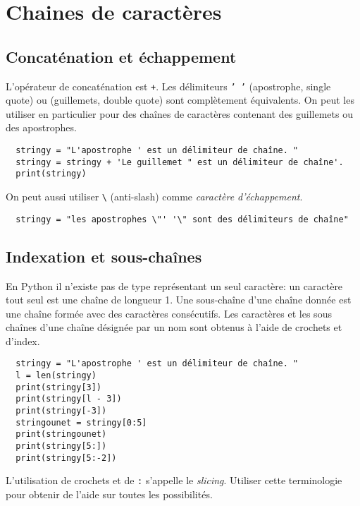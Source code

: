 \section{Chaines de caractères}
\subsection{Concaténation et échappement}
L'opérateur de concaténation est \texttt{+}. Les délimiteurs \texttt{' '} (apostrophe, single quote) ou  (guillemets, double quote) sont complètement équivalents. On peut les utiliser en particulier pour des chaînes de caractères contenant des guillemets ou des apostrophes.
\begin{verbatim}
  stringy = "L'apostrophe ' est un délimiteur de chaîne. " 
  stringy = stringy + 'Le guillemet " est un délimiteur de chaîne'.
  print(stringy)\end{verbatim}
On peut aussi utiliser \verb|\| (anti-slash) comme \emph{caractère d'échappement}. 
\begin{verbatim}
  stringy = "les apostrophes \"' '\" sont des délimiteurs de chaîne"\end{verbatim}

\subsection{Indexation et sous-chaînes}
En Python il n'existe pas de type représentant un seul caractère: un caractère tout seul est une chaîne de longueur 1. Une sous-chaîne d'une chaîne donnée est une chaîne formée avec des caractères consécutifs. Les caractères et les sous chaînes d'une chaîne désignée par un nom sont obtenus à l'aide de crochets et d'index.
\begin{verbatim}
  stringy = "L'apostrophe ' est un délimiteur de chaîne. "
  l = len(stringy)
  print(stringy[3])
  print(stringy[l - 3])
  print(stringy[-3])
  stringounet = stringy[0:5]
  print(stringounet)
  print(stringy[5:])
  print(stringy[5:-2])\end{verbatim}
L'utilisation de crochets et de \verb|:| s'appelle le \emph{slicing}. Utiliser cette terminologie pour obtenir de l'aide sur toutes les possibilités.

